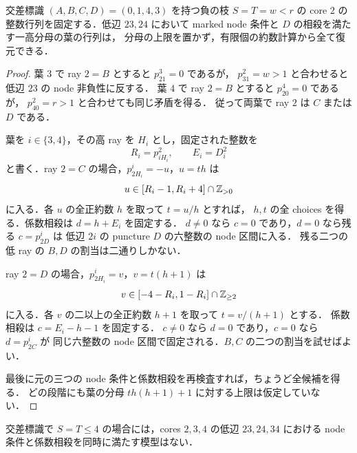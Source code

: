 \begin{lemma}
\label{tl15:finite-leaves}
交差標識 $(A,B,C,D)=(0,1,4,3)$ を持つ負の枝 $S=T=w<r$ の
core $2$ の整数行列を固定する．低辺 $23,24$ において
marked node 条件と $D$ の相殺を満たす一高分母の葉の行列は，
分母の上限を置かず，有限個の約数計算から全て復元できる．
\end{lemma}

\begin{proof}
葉 $3$ で ray $2=B$ とすると $p^3_{21}=0$ であるが，
$p^2_{31}=w>1$ と合わせると低辺 $23$ の node 非負性に反する．
葉 $4$ で ray $2=B$ とすると $p^4_{20}=0$ であるが，
$p^2_{40}=r>1$ と合わせても同じ矛盾を得る．
従って両葉で ray $2$ は $C$ または $D$ である．

葉を $i\in\{3,4\}$，その高 ray を $H_i$ とし，固定された整数を
\[
 R_i=p^2_{iH_i},\qquad E_i=D^2_i
\]
と書く．ray $2=C$ の場合，$p^i_{2H_i}=-u$，$u=th$ は
\[
 u\in[R_i-1,R_i+4]\cap\mathbb Z_{>0}
\]
に入る．各 $u$ の全正約数 $h$ を取って $t=u/h$ とすれば，
$h,t$ の全 choices を得る．係数相殺は $d=h+E_i$ を固定する．
$d\ne0$ なら $c=0$ であり，$d=0$ なら残る $c=p^i_{2D}$ は
低辺 $2i$ の puncture $D$ の六整数の node 区間に入る．
残る二つの低 ray の $B,D$ の割当は二通りしかない．

ray $2=D$ の場合，$p^i_{2H_i}=v$，$v=t(h+1)$ は
\[
 v\in[-4-R_i,1-R_i]\cap\mathbb Z_{\ge2}
\]
に入る．各 $v$ の二以上の全正約数 $h+1$ を取って $t=v/(h+1)$ とする．
係数相殺は $c=E_i-h-1$ を固定する．
$c\ne0$ なら $d=0$ であり，$c=0$ なら $d=p^i_{2C}$ が
同じ六整数の node 区間で固定される．$B,C$ の二つの割当を試せばよい．

最後に元の三つの node 条件と係数相殺を再検査すれば，ちょうど全候補を得る．
どの段階にも葉の分母 $th(h+1)+1$ に対する上限は仮定していない．
\end{proof}

\begin{proposition}[小さい負の枝の低三角形は接続しない]
\label{tl15:small-negative}
交差標識で $S=T\le4$ の場合には，cores $2,3,4$ の低辺
$23,24,34$ における node 条件と係数相殺を同時に満たす模型はない．
\end{proposition}

